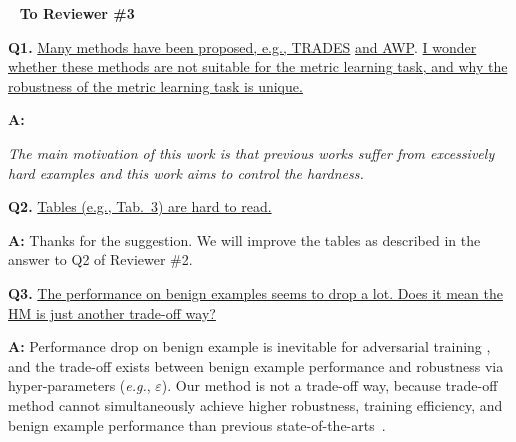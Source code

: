 \documentclass[10pt,twocolumn,letterpaper]{article}
\begin{document}
~\newline
\noindent\textbf{To Reviewer \#3}

\noindent\textbf{Q1.}
%
\ul{Many methods have been proposed, e.g., TRADES}\cite{trades} \ul{and AWP}\cite{awp}.
\ul{I wonder whether these methods are not suitable for the metric learning task, and why the robustness of the metric learning task is unique.
}

\noindent\textbf{A:}

\emph{The main motivation of this work is that previous works suffer from excessively hard examples and this work aims to control the hardness.}

\begin{comment}
\noindent\textbf{Q2.} \ul{Does simple tricks for adjusting the hardness.}
\end{comment}

\noindent\textbf{Q2.}
%
\ul{Tables (e.g., Tab.~3) are hard to read.}

\noindent\textbf{A:} Thanks for the suggestion. We will improve the tables as described in the answer to Q2 of Reviewer \#2.

\noindent\textbf{Q3.}
%
\ul{The performance on benign examples seems to drop a lot. Does it mean the
HM is just another trade-off way?}

\noindent\textbf{A:}
%
Performance drop on benign example is inevitable for adversarial training
\cite{madry,trades,awp,advrank,robrank}, and the trade-off exists
between benign example performance and robustness via hyper-parameters
(\emph{e.g.}, $\varepsilon$).
%
Our method is not a trade-off way, because trade-off method cannot
simultaneously achieve higher robustness, training efficiency, and benign
example performance than previous state-of-the-arts~\cite{advrank,robrank}.

{\small


}
\end{document}
